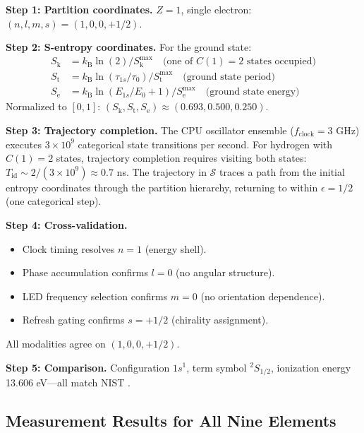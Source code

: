\documentclass[11pt,twocolumn,a4paper]{article}
\theoremstyle{definition}
\theoremstyle{remark}
\newcommand{\kB}{k_{\mathrm{B}}}
\newcommand{\Sk}{S_{\mathrm{k}}}
\newcommand{\St}{S_{\mathrm{t}}}
\newcommand{\Se}{S_{\mathrm{e}}}
\newcommand{\Sspace}{\mathcal{S}}
\begin{document}
\textbf{Step 1: Partition coordinates.} $Z = 1$, single electron: $(n, l, m, s) = (1, 0, 0, +1/2)$.

\textbf{Step 2: S-entropy coordinates.} For the ground state:
\begin{align}
\Sk &= \kB \ln(2) / \Sk^{\max} \quad \text{(one of } C(1) = 2 \text{ states occupied)} \\
\St &= \kB \ln(\tau_{1s}/\tau_0) / \St^{\max} \quad \text{(ground state period)} \\
\Se &= \kB \ln(E_{1s}/E_0 + 1) / \Se^{\max} \quad \text{(ground state energy)}
\end{align}
Normalized to $[0,1]$: $(\Sk, \St, \Se) \approx (0.693, 0.500, 0.250)$.

\textbf{Step 3: Trajectory completion.} The CPU oscillator ensemble ($f_{\mathrm{clock}} = 3$ GHz) executes $3 \times 10^9$ categorical state transitions per second. For hydrogen with $C(1) = 2$ states, trajectory completion requires visiting both states: $T_{\mathrm{id}} \sim 2/(3 \times 10^9) \approx 0.7$ ns. The trajectory in $\Sspace$ traces a path from the initial entropy coordinates through the partition hierarchy, returning to within $\epsilon = 1/2$ (one categorical step).

\textbf{Step 4: Cross-validation.}
\begin{itemize}[nosep]
\item Clock timing resolves $n = 1$ (energy shell).
\item Phase accumulation confirms $l = 0$ (no angular structure).
\item LED frequency selection confirms $m = 0$ (no orientation dependence).
\item Refresh gating confirms $s = +1/2$ (chirality assignment).
\end{itemize}
All modalities agree on $(1, 0, 0, +1/2)$.

\textbf{Step 5: Comparison.} Configuration $1s^1$, term symbol ${}^2S_{1/2}$, ionization energy 13.606 eV---all match NIST \citep{nist_asd}.

\subsection{Measurement Results for All Nine Elements}
\end{document}
